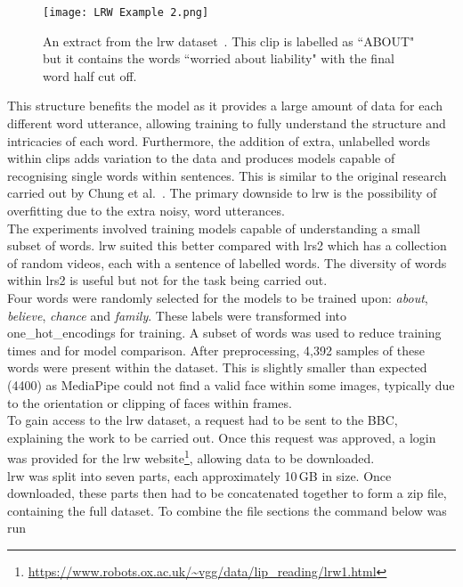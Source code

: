 \begin{figure}
\centering
\texttt{[image: LRW Example 2.png]}
\caption[An extract from the \gls{lrw} dataset.]{An extract from the \gls{lrw} dataset~\cite{Lip-Reading-In-The-Wild}. This clip is labelled as ``ABOUT" but it contains the words ``worried about liability" with the final word half cut off.}
\label{fig:LRW Example 2}
\end{figure}
This structure benefits the model as it provides a large amount of data for each different word utterance, allowing training to fully understand the structure and intricacies of each word. Furthermore, the addition of extra, unlabelled words within clips adds variation to the data and produces models capable of recognising single words within sentences. This is similar to the original research carried out by Chung et al.~\cite{Lip-Reading-In-The-Wild}. The primary downside to \gls{lrw} is the possibility of \gls{overfitting} due to the extra noisy, word utterances.\\ 
The experiments involved training models capable of understanding a small subset of words. \gls{lrw} suited this better compared with \gls{lrs2} which has a collection of random videos, each with a sentence of labelled words. The diversity of words within \gls{lrs2} is useful but not for the task being carried out.\\
Four words were randomly selected for the models to be trained upon: \emph{about}, \emph{believe}, \emph{chance} and \emph{family}. These labels were transformed into \gls{one_hot_encoding}s for training. A subset of words was used to reduce training times and for model comparison. After preprocessing, 4,392 samples of these words were present within the dataset. This is slightly smaller than expected (4400) as MediaPipe could not find a valid face within some images, typically due to the orientation or clipping of faces within frames.\\
To gain access to the \acrshort{lrw} dataset, a request had to be sent to the BBC, explaining the work to be carried out. Once this request was approved, a login was provided for the \acrshort{lrw} website\footnote{\url{https://www.robots.ox.ac.uk/~vgg/data/lip_reading/lrw1.html}}, allowing data to be downloaded.\\
\gls{lrw} was split into seven parts, each approximately 10\,GB in size. Once downloaded, these parts then had to be concatenated together to form a zip file, containing the full dataset. To combine the file sections the command below was run
